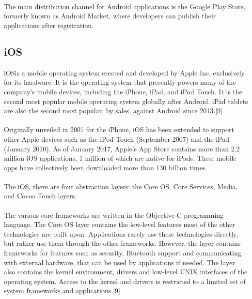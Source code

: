 \paragraph{}
The main distribution channel for Android applications is the Google Play
Store, formerly known as Android Market, where developers can publish their
applications after registration.


\subsection{iOS}

\paragraph{}
iOSis a mobile operating system created and developed by Apple Inc. exclusively for its hardware.
It is the operating system that presently powers many of the company's mobile devices, including the iPhone, iPad, and iPod Touch. It is the second most popular mobile operating system globally after Android. iPad tablets are also the second most popular, by sales, against Android since 2013.[9]

\paragraph{}
Originally unveiled in 2007 for the iPhone, iOS has been extended to support other Apple devices such as the iPod Touch (September 2007) and the iPad (January 2010).
As of January 2017, Apple's App Store contains more than 2.2 million iOS applications, 1 million of which are native for iPads.
These mobile apps have collectively been downloaded more than 130 billion times.

\paragraph{}
The iOS, there are four abstraction layers: the Core OS, Core Services, Media, and Cocoa Touch layers.


\paragraph{}
The various core frameworks are written in the Objective-C programming language.
The Core OS layer contains the low-level features most of the other technologies are built upon.
Applications rarely use these technologies directly, but rather use them through the other frameworks.
However, the layer contains frameworks for features such as security, Bluetooth support and communicating with external hardware, that can be used by applications if needed.
The layer also contains the kernel environment, drivers and low-level UNIX interfaces of the operating system.
Access to the kernel and drivers is restricted to a limited set of system frameworks
and applications.[9]

